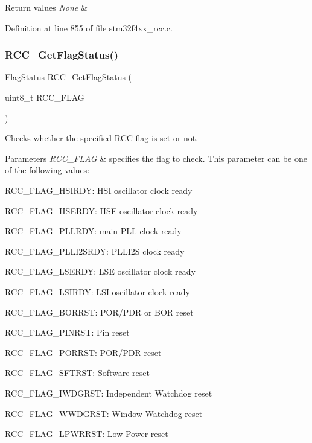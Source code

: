 \begin{DoxyRetVals}{Return values}
{\em None} & \\
\hline
\end{DoxyRetVals}


Definition at line 855 of file stm32f4xx\+\_\+rcc.\+c.

\mbox{\label{group___r_c_c_ga2897bdc52f272031c44fb1f72205d295}} 
\subsubsection{\texorpdfstring{R\+C\+C\+\_\+\+Get\+Flag\+Status()}{RCC\_GetFlagStatus()}}
{\footnotesize\ttfamily Flag\+Status R\+C\+C\+\_\+\+Get\+Flag\+Status (\begin{DoxyParamCaption}\item[{uint8\+\_\+t}]{R\+C\+C\+\_\+\+F\+L\+AG }\end{DoxyParamCaption})}



Checks whether the specified R\+CC flag is set or not. 


\begin{DoxyParams}{Parameters}
{\em R\+C\+C\+\_\+\+F\+L\+AG} & specifies the flag to check. This parameter can be one of the following values\+: \begin{DoxyItemize}
\item R\+C\+C\+\_\+\+F\+L\+A\+G\+\_\+\+H\+S\+I\+R\+DY\+: H\+SI oscillator clock ready \item R\+C\+C\+\_\+\+F\+L\+A\+G\+\_\+\+H\+S\+E\+R\+DY\+: H\+SE oscillator clock ready \item R\+C\+C\+\_\+\+F\+L\+A\+G\+\_\+\+P\+L\+L\+R\+DY\+: main P\+LL clock ready \item R\+C\+C\+\_\+\+F\+L\+A\+G\+\_\+\+P\+L\+L\+I2\+S\+R\+DY\+: P\+L\+L\+I2S clock ready \item R\+C\+C\+\_\+\+F\+L\+A\+G\+\_\+\+L\+S\+E\+R\+DY\+: L\+SE oscillator clock ready \item R\+C\+C\+\_\+\+F\+L\+A\+G\+\_\+\+L\+S\+I\+R\+DY\+: L\+SI oscillator clock ready \item R\+C\+C\+\_\+\+F\+L\+A\+G\+\_\+\+B\+O\+R\+R\+ST\+: P\+O\+R/\+P\+DR or B\+OR reset \item R\+C\+C\+\_\+\+F\+L\+A\+G\+\_\+\+P\+I\+N\+R\+ST\+: Pin reset \item R\+C\+C\+\_\+\+F\+L\+A\+G\+\_\+\+P\+O\+R\+R\+ST\+: P\+O\+R/\+P\+DR reset \item R\+C\+C\+\_\+\+F\+L\+A\+G\+\_\+\+S\+F\+T\+R\+ST\+: Software reset \item R\+C\+C\+\_\+\+F\+L\+A\+G\+\_\+\+I\+W\+D\+G\+R\+ST\+: Independent Watchdog reset \item R\+C\+C\+\_\+\+F\+L\+A\+G\+\_\+\+W\+W\+D\+G\+R\+ST\+: Window Watchdog reset \item R\+C\+C\+\_\+\+F\+L\+A\+G\+\_\+\+L\+P\+W\+R\+R\+ST\+: Low Power reset \end{DoxyItemize}
\\
\hline
\end{DoxyParams}

